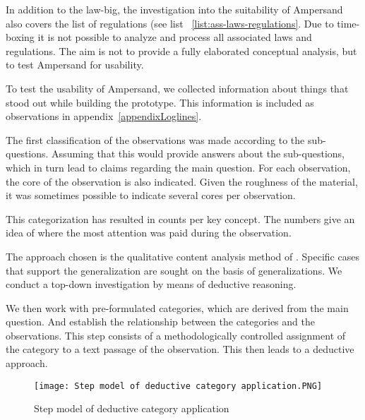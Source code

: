 
In addition to the law-big, the investigation into the suitability of Ampersand also covers the list of regulations (see list ~\ref{list:ass-laws-regulations}.
Due to time-boxing it is not possible to analyze and process all associated laws and regulations.
The aim is not to provide a fully elaborated conceptual analysis, but to test Ampersand for usability.


To test the usability of Ampersand, we collected information about things that stood out while building the prototype.
This information is included as observations in appendix~\ref{appendixLoglines}.

The first classification of the observations was made according to the sub-questions.
Assuming that this would provide answers about the sub-questions, which in turn lead to claims regarding the main question.
For each observation, the core of the observation is also indicated.
Given the roughness of the material, it was sometimes possible to indicate several cores per observation.

This categorization has resulted in counts per key concept.
The numbers give an idea of where the most attention was paid during the observation.

\begin{comment}
Deductief redeneren is een top-down onderzoeksmethode. Je zoekt op basis van een generalisatie naar specifieke gevallen. Met behulp van deductief onderzoek toets je theorieën en hypothesen. Het proces bestaat over het algemeen uit vier stappen: er is een theorie (generalisering), je formuleert een hypothese, je observeert of analyseert, je bevestigt of verwerpt de hypothese.
\end{comment}
The approach chosen is the qualitative content analysis method of \cite{mayring_qualitative_2019}.
Specific cases that support the generalization are sought on the basis of generalizations.
We conduct a top-down investigation by means of deductive reasoning.

We then work with pre-formulated categories, which are derived from the main question.
And establish the relationship between the categories and the observations.
This step consists of a methodologically controlled assignment of the category to a text passage of the observation.
This then leads to a deductive approach.
\begin{figure}[H]
    \centering
    \texttt{[image: Step model of deductive category application.PNG]}
    \caption{Step model of deductive category application\citep{mayring_qualitative_2000}}
    \label{fig:step-model-of-deductive-category-application}
\end{figure}

